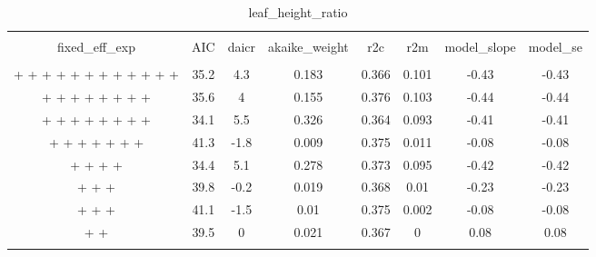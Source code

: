 
\begin{table}[!htbp] \centering 
  \caption{leaf_height_ratio} 
  \label{leaf_height_ratio} 
\begin{tabular}{@{\extracolsep{5pt}} cccccccc} 
\\[-1.8ex]\hline 
\hline \\[-1.8ex] 
fixed\_eff\_exp & AIC & daicr & akaike\_weight & r2c & r2m & model\_slope & model\_se \\ 
\hline \\[-1.8ex] 
 +  +  +  +  +  +  +  +  +  +  +  +  & 35.2 & 4.3 & 0.183 & 0.366 & 0.101 & -0.43 & -0.43 \\ 
 +  +  +  +  +  +  +  +  & 35.6 & 4 & 0.155 & 0.376 & 0.103 & -0.44 & -0.44 \\ 
 +  +  +  +  +  +  +  +  & 34.1 & 5.5 & 0.326 & 0.364 & 0.093 & -0.41 & -0.41 \\ 
 +  +  +  +  +  +  +  & 41.3 & -1.8 & 0.009 & 0.375 & 0.011 & -0.08 & -0.08 \\ 
 +  +  +  +  & 34.4 & 5.1 & 0.278 & 0.373 & 0.095 & -0.42 & -0.42 \\ 
 +  +  +  & 39.8 & -0.2 & 0.019 & 0.368 & 0.01 & -0.23 & -0.23 \\ 
 +  +  +  & 41.1 & -1.5 & 0.01 & 0.375 & 0.002 & -0.08 & -0.08 \\ 
 +  +  & 39.5 & 0 & 0.021 & 0.367 & 0 & 0.08 & 0.08 \\ 
\hline \\[-1.8ex] 
\end{tabular} 
\end{table} 
